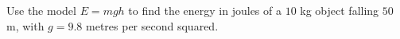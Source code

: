 Use the model $E=mgh$ to find the energy in joules of a $10$ kg object falling $50$ m, with $g=9.8$ metres per second squared.
